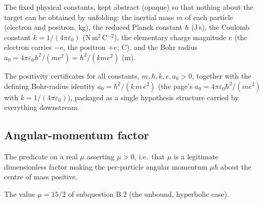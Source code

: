 \begin{definition}
\label{def:IPhO2026Problems_problem_IPhO_2026_1_B_2:constants}
The fixed physical constants, kept abstract (opaque) so that nothing about
the target can be obtained by unfolding: the inertial mass $m$ of each
particle (electron and positron, kg), the reduced Planck constant $\hbar$
(J\,s), the Coulomb constant $k = 1/(4\pi\varepsilon_0)$
(N\,m$^2$\,C$^{-2}$), the elementary charge
magnitude $e$ (the electron carries $-e$, the positron $+e$; C), and the
Bohr radius $a_0 = 4\pi\varepsilon_0\hbar^2/(m e^2) = \hbar^2/(k m e^2)$
(m).
\end{definition}

\begin{definition}
\label{def:IPhO2026Problems_problem_IPhO_2026_1_B_2:ScalingRegime}
The positivity certificates for all constants, $m, \hbar, k, e, a_0 > 0$,
together with the defining Bohr-radius identity
$a_0 = \hbar^2/(k\,m\,e^2)$ (the page's
$a_0 = 4\pi\varepsilon_0\hbar^2/(m e^2)$ with $k = 1/(4\pi\varepsilon_0)$),
packaged as a single hypothesis structure carried by everything downstream.
\end{definition}

\subsection*{Angular-momentum factor}

\begin{definition}
\label{def:IPhO2026Problems_problem_IPhO_2026_1_B_2:IsAngularMomentumFactor}
The predicate on a real $\mu$ asserting $\mu > 0$, i.e.\ that $\mu$ is a
legitimate dimensionless factor making the per-particle angular momentum
$\mu\hbar$ about the centre of mass positive.
\end{definition}

\begin{definition}[The unbound-case value $\mu = 15/2$]
\label{def:IPhO2026Problems_problem_IPhO_2026_1_B_2:unboundMu}
The value $\mu = 15/2$ of subquestion B.2 (the unbound, hyperbolic case).
\end{definition}

